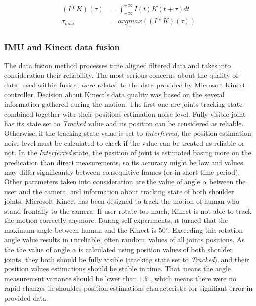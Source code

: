 \documentclass[sensors,article,submit,moreauthors,pdftex,10pt,a4paper]{mdpi}
\newcommand{\degree}{\ensuremath{{}^{\circ}}\xspace}
\begin{document}
	\begin{subequations}
		\begin{align}
			(I \ast K)(\tau) & = \int_{-\infty}^{+\infty}I(t)K(t+\tau)dt\label{eq:cross-cor:1}   \\
			\tau_{max}       & = \underset{\tau}{argmax}((I \ast K)(\tau))\label{eq:cross-cor:2} 
		\end{align}
		\label{eq:cross-cor}
	\end{subequations}
		
		
		
	\subsubsection{IMU and Kinect data fusion}
	The data fusion method processes time aligned filtered data and takes into consideration their reliability. The most serious concerns about the quality of data, used within fusion, were related to the data provided by Microsoft Kinect controller. Decision about Kinect’s data quality was based on the several information gathered during the motion. The first one are joints tracking state combined together with their positions estimation noise level. Fully visible joint has its state set to \emph{Tracked} value and its position can be considered as reliable. Otherwise, if the tracking state value is set to \emph{Interferred}, the position estimation noise level must be calculated to check if the value can be treated as reliable or not. In the \emph{Interferred} state, the position of joint is estimated basing more on the predication than direct measurements, so its accuracy might be low and values may differ significantly between consequitive frames (or in short time period). Other parameters taken into consideration are the value of angle $\alpha$ between the user and the camera, and information about tracking state of both shoulder joints. Microsoft Kinect has been designed to track the motion of human who stand frontally to the camera. If user rotate too much, Kinect is not able to track the motion correctly anymore. During self experiments, it turned that the maximum angle between human and the Kinect is $50\degree$. Exceeding this rotation angle value results in unreliable, often random, values of all joints positions. As the the value of angle $\alpha$ is calculated using position values of both shoulder joints, they both should be fully visible (tracking state set to \emph{Tracked}), and their position values estimations should be stable in time. That means the angle measurement variance should be lower than $1.5\degree$, which means there were no rapid changes in shouldes position estimations characteristic for signifiant error in provided data. 
		
\end{document}
